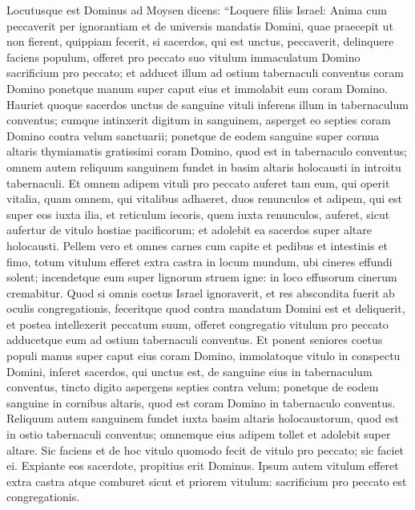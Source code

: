 \begin{biblechapter}  
\verse Locutusque est Dominus ad Moysen dicens: 
\verse “Loquere filiis Israel: Anima cum peccaverit per ignorantiam et de universis mandatis Domini, quae praecepit ut non fierent, quippiam fecerit, 
\verse si sacerdos, qui est unctus, peccaverit, delinquere faciens populum, offeret pro peccato suo vitulum immaculatum Domino sacrificium pro peccato; 
\verse et adducet illum ad ostium tabernaculi conventus coram Domino ponetque manum super caput eius et immolabit eum coram Domino. 
\verse Hauriet quoque sacerdos unctus de sanguine vituli inferens illum in tabernaculum conventus; 
\verse cumque intinxerit digitum in sanguinem, asperget eo septies coram Domino contra velum sanctuarii; 
\verse ponetque de eodem sanguine super cornua altaris thymiamatis gratissimi coram Domino, quod est in tabernaculo conventus; omnem autem reliquum sanguinem fundet in basim altaris holocausti in introitu tabernaculi. 
\verse Et omnem adipem vituli pro peccato auferet tam eum, qui operit vitalia, quam omnem, qui vitalibus adhaeret, 
\verse duos renunculos et adipem, qui est super eos iuxta ilia, et reticulum iecoris, quem iuxta renunculos, auferet, 
\verse sicut aufertur de vitulo hostiae pacificorum; et adolebit ea sacerdos super altare holocausti. 
\verse Pellem vero et omnes carnes cum capite et pedibus et intestinis et fimo, 
\verse totum vitulum efferet extra castra in locum mundum, ubi cineres effundi solent; incendetque eum super lignorum struem igne: in loco effusorum cinerum cremabitur. 
\verse Quod si omnis coetus Israel ignoraverit, et res abscondita fuerit ab oculis congregationis, feceritque quod contra mandatum Domini est et deliquerit, 
\verse et postea intellexerit peccatum suum, offeret congregatio vitulum pro peccato adducetque eum ad ostium tabernaculi conventus. 
\verse Et ponent seniores coetus populi manus super caput eius coram Domino, immolatoque vitulo in conspectu Domini, 
\verse inferet sacerdos, qui unctus est, de sanguine eius in tabernaculum conventus, 
\verse tincto digito aspergens septies contra velum;  
\verse ponetque de eodem sanguine in cornibus altaris, quod est coram Domino in tabernaculo conventus. Reliquum autem sanguinem fundet iuxta basim altaris holocaustorum, quod est in ostio tabernaculi conventus; 
\verse omnemque eius adipem tollet et adolebit super altare. 
\verse Sic faciens et de hoc vitulo quomodo fecit de vitulo pro peccato; sic faciet ei. Expiante eos sacerdote, propitius erit Dominus. 
\verse Ipsum autem vitulum efferet extra castra atque comburet sicut et priorem vitulum: sacrificium pro peccato est congregationis. 

\end{biblechapter}
